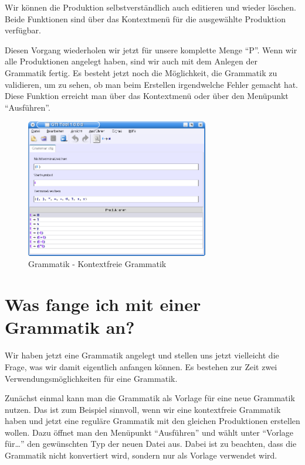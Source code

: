 Wir können die Produktion selbstverständlich auch editieren und wieder löschen.
Beide Funktionen sind über das Kontextmenü für die ausgewählte Produktion
verfügbar.\vspace{10pt}

Diesen Vorgang wiederholen wir jetzt für unsere komplette Menge "`P"'. Wenn wir
alle Produktionen angelegt haben, sind wir auch mit dem Anlegen der Grammatik
fertig. Es besteht jetzt noch die Möglichkeit, die Grammatik zu validieren, um
zu sehen, ob man beim Erstellen irgendwelche Fehler gemacht hat. Diese Funktion
erreicht man über das Kontextmenü oder über den Menüpunkt "`Ausführen"'.

\begin{figure}[h]
\begin{center}
\includegraphics[width=8cm]{../images/cfg_example.png}
\caption{Grammatik - Kontextfreie Grammatik}
\end{center}
\end{figure}

\section{Was fange ich mit einer Grammatik an?}

Wir haben jetzt eine Grammatik angelegt und stellen uns jetzt vielleicht die
Frage, was wir damit eigentlich anfangen können. Es bestehen zur Zeit zwei
Verwendungsmöglichkeiten für eine Grammatik.\vspace{10pt}

Zunächst einmal kann man die Grammatik als Vorlage für eine neue Grammatik
nutzen. Das ist zum Beispiel sinnvoll, wenn wir eine kontextfreie Grammatik
haben und jetzt eine reguläre Grammatik mit den gleichen Produktionen
erstellen wollen. Dazu öffnet man den Menüpunkt "`Ausführen"' und wählt unter
"`Vorlage für\ldots"' den gewünschten Typ der neuen Datei aus.
Dabei ist zu beachten, dass die Grammatik nicht konvertiert wird,
sondern nur als Vorlage verwendet wird.\vspace{10pt}

